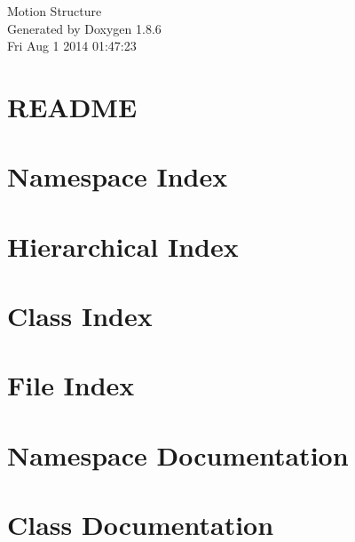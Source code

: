 \documentclass[twoside]{book}
\newcommand{\clearemptydoublepage}{%
  \newpage{\pagestyle{empty}\cleardoublepage}%
}
\begin{document}
\hypersetup{pageanchor=false}
\begin{titlepage}
\vspace*{7cm}
\begin{center}%
{\Large Motion Structure }\\
\vspace*{1cm}
{\large Generated by Doxygen 1.8.6}\\
\vspace*{0.5cm}
{\small Fri Aug 1 2014 01:47:23}\\
\end{center}
\end{titlepage}
\clearemptydoublepage
\tableofcontents
\clearemptydoublepage
{}
\hypersetup{pageanchor=true}

\chapter{R\-E\-A\-D\-M\-E}
\label{md__r_e_a_d_m_e}
\hypertarget{md__r_e_a_d_m_e}{}

\chapter{Namespace Index}

\chapter{Hierarchical Index}

\chapter{Class Index}

\chapter{File Index}

\chapter{Namespace Documentation}

\chapter{Class Documentation}


















\end{document}
